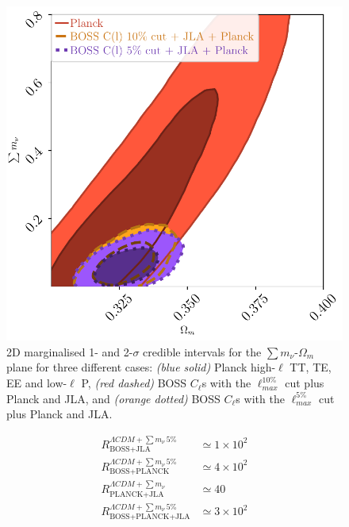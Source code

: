 \begin{figure}
\begin{center}
\includegraphics[scale=0.70]{BOSS-FIGS/neutrino_2D.pdf}
\caption[2D marginalised 1- and 2-$\sigma$ credible intervals for the $\sum m_{\nu}$-$\Omega_m$ plane.]{2D marginalised 1- and 2-$\sigma$ credible intervals for the $\sum m_{\nu}$-$\Omega_m$ plane for three different cases: \textit{(blue solid)} Planck high-$\ell$ TT, TE, EE and low-$\ell$ P, \textit{(red dashed)} BOSS $C_{\ell}$s with the $\ell_{max}^{10\%}$ cut plus Planck and JLA, and \textit{(orange dotted)} BOSS $C_{\ell}$s with the $\ell_{max}^{5\%}$ cut plus Planck and JLA.}
\label{fig:neutrinoCompare2}
\end{center}
\end{figure}

\begin{align}
R_{\scriptscriptstyle\text{BOSS+JLA}}^{\Lambda CDM + \sum m_{\nu} \, 5\%} & \simeq 1\times 10^2  \\
R_{\scriptscriptstyle\text{BOSS+PLANCK}}^{\Lambda CDM +\sum m_{\nu} \, 5\%} & \simeq 4\times 10^2 \\
R_{\scriptscriptstyle\text{PLANCK+JLA}}^{\Lambda CDM +\sum m_{\nu}} & \simeq 40 \\
R_{\scriptscriptstyle\text{BOSS+PLANCK+JLA}}^{\Lambda CDM +\sum m_{\nu} \, 5\%} & \simeq 3 \times 10^2
\end{align}
 

